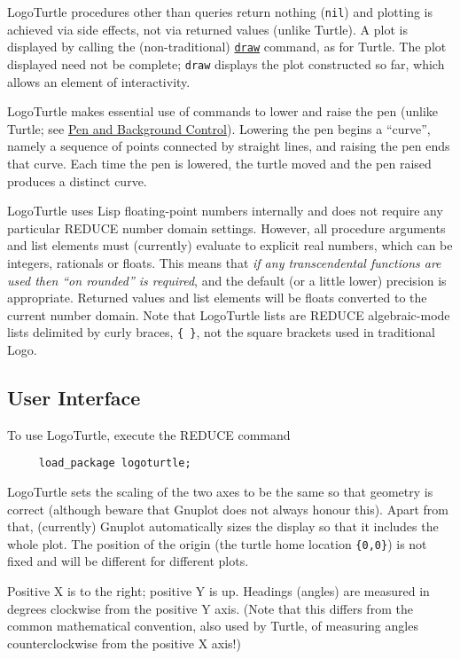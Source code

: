LogoTurtle procedures other than queries return nothing (\texttt{nil})
and plotting is achieved via side effects, not via returned values
(unlike Turtle).  A plot is displayed by calling the (non-traditional)
\hyperref[logoturtle:draw]{\texttt{draw}} command, as for Turtle.
The plot displayed need not be complete; \texttt{draw} displays the
plot constructed so far, which allows an element of interactivity.

LogoTurtle makes essential use of commands to lower and raise the pen
(unlike Turtle; see \hyperref[logoturtle:PBC]{Pen and Background
  Control}).  Lowering the pen begins a ``curve'', namely a sequence
of points connected by straight lines, and raising the pen ends that
curve.  Each time the pen is lowered, the turtle moved and the pen
raised produces a distinct curve.

LogoTurtle uses Lisp floating-point numbers internally and does not
require any particular REDUCE number domain settings.  However, all
procedure arguments and list elements must (currently) evaluate to
explicit real numbers, which can be integers, rationals or floats.
This means that \emph{if any transcendental functions are used then
``on rounded'' is required}, and the default (or a little lower)
precision is appropriate.  Returned values and list elements will be
floats converted to the current number domain.  Note that LogoTurtle
lists are REDUCE algebraic-mode lists delimited by curly braces,
\texttt{\{~\}}, not the square brackets used in traditional Logo.

\subsection{User Interface}

To use LogoTurtle, execute the REDUCE command
\begin{verbatim}
     load_package logoturtle;
\end{verbatim}

LogoTurtle sets the scaling of the two axes to be the same so that
geometry is correct (although beware that Gnuplot does not always
honour this).  Apart from that, (currently) Gnuplot automatically
sizes the display so that it includes the whole plot.  The position of
the origin (the turtle home location \texttt{\{0,0\}}) is not fixed
and will be different for different plots.

Positive X is to the right; positive Y is up.  Headings (angles) are
measured in degrees clockwise from the positive Y axis.  (Note that
this differs from the common mathematical convention, also used by
Turtle, of measuring angles counterclockwise from the positive X
axis!)

